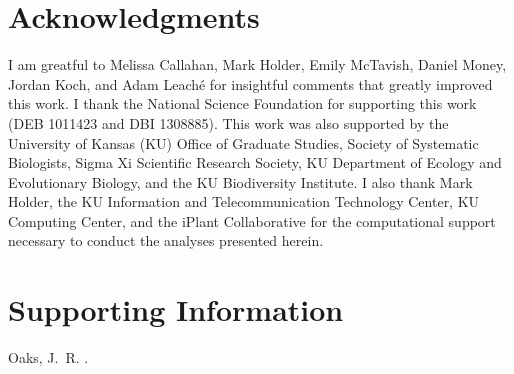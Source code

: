\documentclass[letterpaper,12pt]{article}
\makeatletter
\let\msTitle\@title
\makeatother
\begin{document}
\newpage



\section{Acknowledgments}
I am greatful to Melissa Callahan, Mark Holder, Emily McTavish, Daniel Money,
Jordan Koch, and Adam Leach\'{e} for insightful comments that greatly improved
this work.
I thank the National Science Foundation for supporting this work (DEB
1011423 and DBI 1308885).
This work was also supported by the University of Kansas (KU) Office of Graduate
Studies, Society of Systematic Biologists, Sigma Xi Scientific Research
Society, KU Department of Ecology and Evolutionary Biology, and the KU
Biodiversity Institute.
I also thank Mark Holder, the KU Information and Telecommunication Technology
Center, KU Computing Center, and the iPlant Collaborative for the computational
support necessary to conduct the analyses presented herein.



\newpage
\singlespacing

\renewcommand\listfigurename{Figure Captions}
\renewcommand\cftdotsep{\cftnodots}
\setlength\cftbeforefigskip{10pt}
\listoffigures



\newpage
\singlespacing



\clearpage

\newpage



\setcounter{figure}{0}
\setcounter{table}{0}
\setcounter{page}{1}
\setcounter{section}{0}

\singlespacing

\section*{Supporting Information}
\hangindent=1cm
Oaks, J.\ R. \msTitle.

\newpage
\singlespacing


\end{document}

